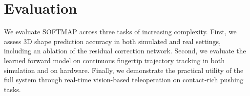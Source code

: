 \documentclass[letterpaper, 10 pt, conference]{ieeeconf}  %
\newcommand{\algname}{SOFTMAP\xspace}
\begin{document}
\section{Evaluation}
We evaluate \algname across three tasks of increasing complexity. First, we assess 3D shape prediction accuracy in both simulated and real settings, including an ablation of the residual correction network. Second, we evaluate the learned forward model on continuous fingertip trajectory tracking in both simulation and on hardware. Finally, we demonstrate the practical utility of the full system through real-time vision-based teleoperation on contact-rich pushing tasks.




\end{document}

